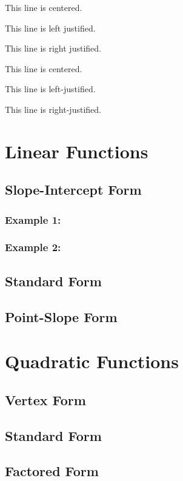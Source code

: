 \documentclass[11pt]{article}
\begin{document}
\vspace{1cm}

\begin{center}
This line is centered.
\end{center}

\begin{flushleft}
This line is left justified.
\end{flushleft}

\begin{flushright}
This line is right justified.
\end{flushright}

\tiny
This line is centered.

This line is left-justified.

This line is right-justified.

\section{Linear Functions}
	\subsection{Slope-Intercept Form}
		\subsubsection{Example 1:}
		\subsubsection{Example 2:}
	\subsection{Standard Form}
	\subsection{Point-Slope Form}
\section{Quadratic Functions}
	\subsection{Vertex Form}
	\subsection{Standard Form}
	\subsection{Factored Form}
\end{document}
